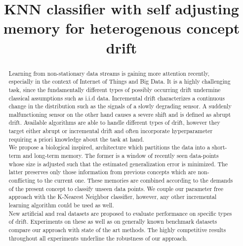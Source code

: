 \documentclass[conference]{IEEEtran}
\begin{document}
\title{KNN classifier with self adjusting memory for heterogenous concept drift }


\author{
}



\maketitle


\setcounter{figure}{0}
\begin{abstract}
Learning from non-stationary data streams is gaining more attention
recently, especially in the context of Internet of Things and Big Data.
It is a highly challenging task, since the fundamentally different types
of possibly occurring drift undermine classical assumptions such as
i.i.d data. Incremental drift characterizes a continuous change in the
distribution such as the signals of a slowly degrading sensor. A
suddenly malfunctioning sensor on the other hand causes a severe shift
and is defined as abrupt drift. Available algorithms are able to handle
different types of drift, however they target either abrupt or
incremental drift and often incorporate hyperparameter requiring a
priori knowledge about the task at hand.\\
We propose a biological inspired, architecture which partitions the data
into a short-term and long-term memory. The former is a window of
recently seen data-points whose size is adjusted such that the estimated
generalization error is minimized. The latter preserves only those
information from previous concepts which are non-conflicting to the
current one. These memories are combined according to the demands of the
present concept to classify unseen data points. We couple our parameter
free approach with the K-Nearest Neighbor classifier, however, any other
incremental learning algorithm could be used as well. \\
New artificial and real datasets are proposed to evaluate performance on
specific types of drift. Experiments on these as well as on generally
known benchmark datasets compare our approach with state of the art
methods. The highly competitive results throughout all experiments
underline the robustness of our approach.
\end{abstract}
\end{document}
